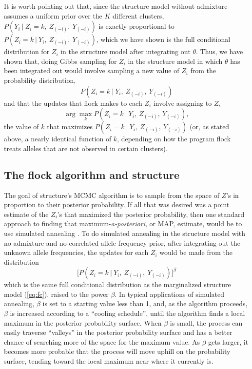 It is worth pointing out that, since the
{\sc structure} model without admixture assumes a uniform prior over 
the $K$ different clusters, $P(Y_{i}~|~Z_i=k,~Z_{(-i)},~Y_{(-i)})$
is exactly proportional to $P(Z_i=k~|~Y_i, ~Z_{(-i)},~Y_{(-i)})$, which 
we have shown is the
full conditional distribution for $Z_i$ in the {\sc structure} model after
integrating out $\theta$.  Thus, we have shown that, doing Gibbs
sampling for $Z_i$ in  the {\sc structure} model in which $\theta$ has been
integrated out would involve sampling a new value of $Z_i$ from the 
probability distribution,
\[
P(Z_i=k~|~Y_i, ~Z_{(-i)},~Y_{(-i)})
\]
and that the updates that
{\sc flock} makes to each $Z_i$ involve assigning to $Z_i$
\begin{equation}
\arg\max_k P(Z_i=k~|~Y_i, ~Z_{(-i)},~Y_{(-i)}),
\end{equation}
\ie the value of $k$ that maximizes $P(Z_i=k~|~Y_i, ~Z_{(-i)},~Y_{(-i)})$
(or, as stated above, a nearly identical function of $k$, depending on how
the program {\sc flock} treats alleles that are not observed in certain clusters).

\subsection*{The {\sc flock} algorithm and {\sc structure}}
The goal of {\sc structure}'s MCMC algorithm is to sample from the space of 
$Z$'s in proportion to their posterior probability.  If all that was desired
was a point estimate of the $Z_i$'s that maximized the posterior probability,
then one standard approach to finding that maximum-{\em a-posteriori}, or MAP, 
estimate, would be to use simulated annealing \citep{Kirkpatricketal1983}.
To do simulated annealing in the {\sc structure} model with no admixture and
no correlated allele frequency prior, after integrating out the unknown
allele frequencies, the updates for each $Z_i$ would be made from the 
distribution
\[
\biggl[P(Z_i=k~|~Y_i, ~Z_{(-i)},~Y_{(-i)})\biggr]^\beta
\]
which is the same full conditional distribution as the marginalized {\sc structure}
model (\ref{eq:fc}), raised
to the power $\beta$.  In typical applications of simulated annealing,
$\beta$ is set to a starting value less than 1, and, as the algorithm proceeds,
$\beta$ is increased according to a ``cooling schedule''\citep{Hajek1988}, until
the algorithm finds a local maximum in the posterior probability surface.  
When $\beta$ is small, the process can easily traverse ``valleys''
in the posterior probability surface and has a better chance of searching
more of the space for the maximum value.  As $\beta$ gets larger, it becomes
more probable that the process will
move uphill on the probability surface, tending toward the local
maximum near where it currently is.    

